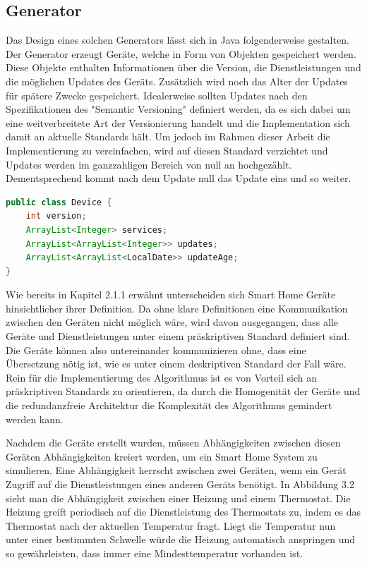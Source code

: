 \subsection{Generator}
Das Design eines solchen Generators lässt sich in Java folgenderweise gestalten.
Der Generator erzeugt Geräte, welche in Form von Objekten gespeichert werden. Diese Objekte enthalten Informationen über
die Version, die Dienstleistungen und die möglichen Updates des Geräts. Zusätzlich wird noch das Alter der Updates für spätere
Zwecke gespeichert. Idealerweise sollten Updates nach den Spezifikationen des "Semantic Versioning" definiert werden, da es sich
dabei um eine weitverbreitete Art der Versionierung handelt und die Implementation sich damit an aktuelle Standards hält.
Um jedoch im Rahmen dieser Arbeit die Implementierung zu vereinfachen, wird auf diesen Standard verzichtet und Updates werden
im ganzzahligen Bereich von null an hochgezählt. Dementsprechend kommt nach dem Update null das Update eins und so weiter.
\begin{lstlisting}[language=Java]
public class Device {
    int version;
    ArrayList<Integer> services;
    ArrayList<ArrayList<Integer>> updates;
    ArrayList<ArrayList<LocalDate>> updateAge;
}
\end{lstlisting}
Wie bereits in Kapitel 2.1.1 erwähnt unterscheiden sich Smart Home Geräte hinsichtlicher ihrer Definition.
Da ohne klare Definitionen eine Kommunikation zwischen den Geräten nicht
möglich wäre, wird davon ausgegangen, dass alle Geräte und Dienstleistungen unter einem präskriptiven Standard
definiert sind. Die Geräte können also untereinander kommunizieren ohne, dass eine Übersetzung nötig ist, wie es unter einem deskriptiven
Standard der Fall wäre. Rein für die Implementierung des Algorithmus ist es von Vorteil sich an präskriptiven Standards zu orientieren, 
da durch die Homogenität der Geräte und die redundanzfreie Architektur die Komplexität des Algorithmus gemindert werden kann.


Nachdem die Geräte erstellt wurden, müssen Abhängigkeiten zwischen diesen Geräten Abhängigkeiten kreiert werden, um 
ein Smart Home System zu simulieren. Eine Abhängigkeit herrscht zwischen zwei Geräten, wenn ein Gerät Zugriff auf die
Dienstleistungen eines anderen Geräts benötigt. In Abbildung 3.2 sieht man die Abhängigkeit zwischen einer Heizung und einem Thermostat.
Die Heizung greift periodisch auf die Dienstleistung des Thermostats zu, indem es das Thermostat nach der aktuellen Temperatur fragt.
Liegt die Temperatur nun unter einer bestimmten Schwelle würde die Heizung automatisch anspringen und so gewährleisten, dass immer eine
Mindesttemperatur vorhanden ist.

